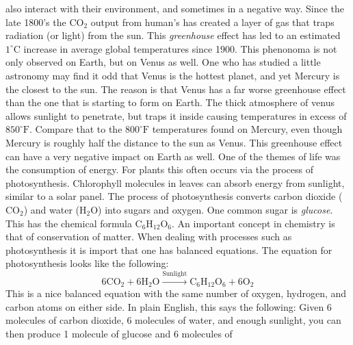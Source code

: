 \documentclass[crop=false,class=book,oneside]{standalone}
\begin{document}
        also interact with their environment, and sometimes
        in a negative way. Since the late 1800's the
        $\textrm{CO}_{2}$ output from human's has created
        a layer of gas that traps radiation (or light) from
        the sun. This \textit{greenhouse} effect has led to
        an estimated $1^{\circ}\textrm{C}$ increase in
        average global temperatures since 1900. This
        phenonoma is not only observed on Earth, but on
        Venus as well. One who has studied a little
        astronomy may find it odd that Venus is the hottest
        planet, and yet Mercury is the closest to the sun.
        The reason is that Venus has a far worse greenhouse
        effect than the one that is starting to form on
        Earth. The thick atmosphere of venus allows sunlight
        to penetrate, but traps it inside causing temperatures
        in excess of $850^{\circ}\textrm{F}$.  Compare that
        to the $800^{\circ}\textrm{F}$ temperatures
        found on Mercury, even though Mercury is roughly
        half the distance to the sun as Venus. This
        greenhouse effect can have a very negative impact
        on Earth as well. One of the themes of life was
        the consumption of energy. For plants this often
        occurs via the process of photosynthesis.
        Chlorophyll molecules in leaves can absorb energy
        from sunlight, similar to a solar panel. The
        process of photosynthesis converts carbon dioxide
        ($\textrm{CO}_{2}$) and water
        ($\textrm{H}_{2}\textrm{O}$) into sugars and
        oxygen. One common sugar is \textit{glucose}.
        This has the chemical formula
        $\textrm{C}_{6}\textrm{H}_{12}\textrm{O}_{6}$. An
        important concept in chemistry is that of
        conservation of matter. When dealing with
        processes such as photosynthesis it is import that
        one has balanced equations. The equation for
        photosynthesis looks like the following:
        \begin{equation}
            6\textrm{CO}_{2}+6\textrm{H}_{2}\textrm{O}
            \overset{\textrm{Sunlight}}{\longrightarrow}
            \textrm{C}_{6}\textrm{H}_{12}\textrm{O}_{6}
            +6\textrm{O}_{2}
        \end{equation}
        This is a nice balanced equation with the same number
        of oxygen, hydrogen, and carbon atoms on either side.
        In plain English, this says the following: Given
        6 molecules of carbon dioxide, 6 molecules of water,
        and enough sunlight, you can then produce
        1 molecule of glucose and 6 molecules of
\end{document}
